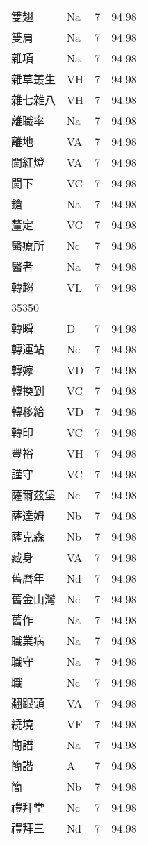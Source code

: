 \documentclass[twocolumn]{book}
\begin{document}
\begin{supertabular}{llrr}
雙翅 & Na & 7 &  94.98\\
雙肩 & Na & 7 &  94.98\\
雜項 & Na & 7 &  94.98\\
雜草叢生 & VH & 7 &  94.98\\
雜七雜八 & VH & 7 &  94.98\\
離職率 & Na & 7 &  94.98\\
離地 & VA & 7 &  94.98\\
闖紅燈 & VA & 7 &  94.98\\
闖下 & VC & 7 &  94.98\\
鎗 & Na & 7 &  94.98\\
釐定 & VC & 7 &  94.98\\
醫療所 & Nc & 7 &  94.98\\
醫者 & Na & 7 &  94.98\\
轉趨 & VL & 7 &  94.98\\
35350\\
轉瞬 & D & 7 &  94.98\\
轉運站 & Nc & 7 &  94.98\\
轉嫁 & VD & 7 &  94.98\\
轉換到 & VC & 7 &  94.98\\
轉移給 & VD & 7 &  94.98\\
轉印 & VC & 7 &  94.98\\
豐裕 & VH & 7 &  94.98\\
謹守 & VC & 7 &  94.98\\
薩爾茲堡 & Nc & 7 &  94.98\\
薩達姆 & Nb & 7 &  94.98\\
薩克森 & Nb & 7 &  94.98\\
藏身 & VA & 7 &  94.98\\
舊曆年 & Nd & 7 &  94.98\\
舊金山灣 & Nc & 7 &  94.98\\
舊作 & Na & 7 &  94.98\\
職業病 & Na & 7 &  94.98\\
職守 & Na & 7 &  94.98\\
職 & Nc & 7 &  94.98\\
翻跟頭 & VA & 7 &  94.98\\
繞境 & VF & 7 &  94.98\\
簡譜 & Na & 7 &  94.98\\
簡諧 & A & 7 &  94.98\\
簡 & Nb & 7 &  94.98\\
禮拜堂 & Nc & 7 &  94.98\\
禮拜三 & Nd & 7 &  94.98\\

\end{supertabular}
\end{document}
